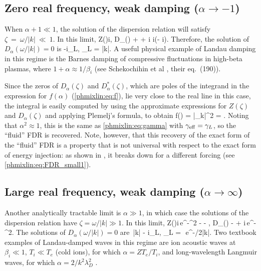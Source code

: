 \subsection{Zero real frequency, weak damping ($\alpha\to-1$)} 
\label{phmixlin:sec:small}

When $\alpha+1\ll1$, the solution of the dispersion relation will satisfy 
$\zeta~=~\omega/|k|~\ll~1$. In this limit, 
\beq
Z(\zeta)\approx i\sqrt{\pi},\quad
D_\alpha(\zeta) +  + i\zeta\sqrt{\pi} 
\approx i\sqrt{\pi}\lt(\zeta - i\rt).
\label{phmixlin:eq:Da_small}
\eeq
Therefore, the solution of $D_\alpha(\omega/|k|)=0$ is 
\beq
\omega \approx -i\gamma_L, \quad
\gamma_L = |k|. 
\label{phmixlin:eq:omega_small}
\eeq
A useful physical example of Landau damping in this regime is the Barnes damping \cite{barnes66}
of compressive fluctuations in high-beta plasmas, where $1+\alpha\approx 1/\beta_i$ 
(see Schekochihin et al \cite{tome}, their eq.~(190)).

Since the zeros of $D_\alpha(\zeta)$ and $D_\alpha^*(\zeta)$, which are 
poles of the integrand in the expression for $f(\alpha)$ (\eqref{phmixlin:eq:f}), 
lie very close to the real line in this case, the integral is easily 
computed by using the approximate expressions  for $Z(\zeta)$
and $D_\alpha(\zeta)$ and applying Plemelj's formula, to obtain 
\beq
f(\alpha) \approx {} = 
\quad\Rightarrow\quad
\la|\phi_k|^2\ra\approx {} = .
\label{phmixlin:eq:FDR_small}
\eeq
Noting that $\alpha^2\approx1$, this is the same as 
\eqref{phmixlin:eq:gamma} with $\gamma_{\rm eff}=\gamma_L$, so the ``fluid'' FDR is recovered.  
Note, however, that this recovery of the exact form of the ``fluid'' FDR 
is a property that is not universal with respect to the exact form of 
energy injection: as shown in , it breaks down for 
a different forcing (see \eqref{phmixlin:eq:FDR_small1}).       


\subsection{Large real frequency, weak damping ($\alpha\to\infty$)} 
\label{phmixlin:sec:large}
 
Another analytically tractable limit is $\alpha\gg1$, in which case the solutions of the 
dispersion relation have $\zeta=\omega/|k|\gg1$. In this limit, 
\beq
Z(\zeta)\approx i\sqrt{\pi}\,e^{-\zeta^2} -  - ,\quad
D_\alpha(\zeta)\approx {} -  + i\sqrt{\pi}\,\zeta e^{-\zeta^2}.
\label{phmixlin:eq:Da_large}
\eeq
The solutions of $D_\alpha(\omega/|k|)=0$ are 
\beq
\omega \approx \pm{}\,|k| - i\gamma_L,\quad
\gamma_L = \sqrt{\pi}\,\,e^{-\alpha/2}|k|.
\label{phmixlin:eq:omega_large}
\eeq
Two textbook examples of Landau-damped waves in this regime are 
ion acoustic waves at $\beta_i\ll1$, $T_i\ll T_e$ (cold ions), for which $\alpha=ZT_e/T_i$, 
and long-wavelength Langmuir waves, for which $\alpha = 2/k^2\lambda_D^2$ \cite{landau46}. 

